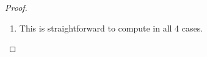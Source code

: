 \documentclass[10pt,a4paper]{amsart}
\begin{document}
\begin{proof}
\begin{enumerate}
\begin{enumerate}
    \begin{align*}(i,i+1)\cdot ( (i+1,i+2)\cdot ( (i,i+1)\cdot F))    &=(i,i+1)\cdot ( (i+1,i+2) \cdot s_i(F))\\
    &=(i,i+1)\cdot s_{i+1} s_i(F))\\
    &=s_i s_{i+1} s_i(F)),\\
    \intertext{and}
        (i+1,i+2)\cdot ( (i,i+1)\cdot ( (i+1,i+2)\cdot F))&=(i+1,i+2)\cdot ( (i,i+1)\cdot s_{i+1}(F)\\
        &=(i+1,i+2)\cdot (  s_is_{i+1}(F)\\
        &=s_{i+1} s_is_{i+1}(F).
    \end{align*}
    Now, $s_{i}s_{i+1}s_i(F)=s_{i+1}s_is_{i+1}(F)$ because \[(i,i+1)(i+1,i+2)(i,i+1)=(i+1,i+2)(i,i+1)(i+1,i+2).\]
\end{enumerate}
\item This is straightforward to compute in all 4 cases. \qedhere
\end{enumerate}
\end{proof}
\end{document}
